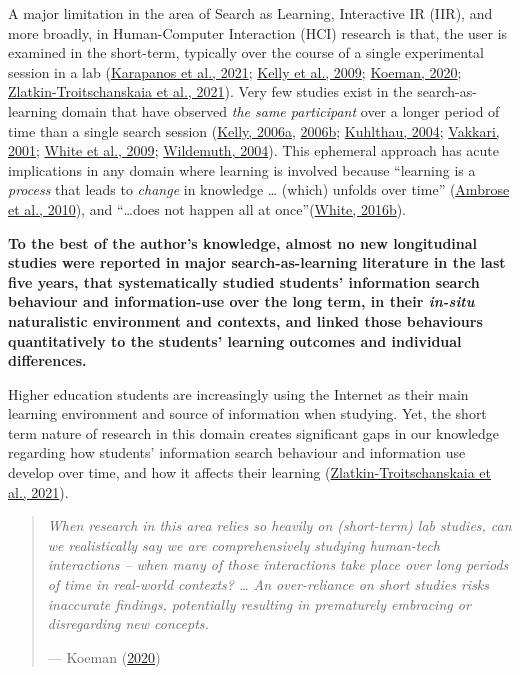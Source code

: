 \documentclass[letterpaper, nobind]{templates/ociamthesis}
\begin{document}
A major limitation in the area of Search as Learning, Interactive IR (IIR), and more broadly, in Human-Computer Interaction (HCI) research is
that, the user is examined in the short-term, typically over the course of a single experimental session in a lab
(\protect\hyperlink{ref-karapanos2021advances}{Karapanos et al., 2021}; \protect\hyperlink{ref-kelly2009evaluation}{Kelly et al., 2009}; \protect\hyperlink{ref-HCIUXres81_online}{Koeman, 2020}; \protect\hyperlink{ref-zlatkin2021students}{Zlatkin-Troitschanskaia et al., 2021}).
Very few studies exist in the search-as-learning domain that have observed \emph{the same participant} over a longer period of time than a single search session (\protect\hyperlink{ref-kelly2006measuring_a}{Kelly, 2006a}, \protect\hyperlink{ref-kelly2006measuring_b}{2006b}; \protect\hyperlink{ref-kuhlthau2004seeking}{Kuhlthau, 2004}; \protect\hyperlink{ref-vakkari2001changes}{Vakkari, 2001}; \protect\hyperlink{ref-white2009characterizing}{White et al., 2009}; \protect\hyperlink{ref-wildemuth2004effects}{Wildemuth, 2004}).
This ephemeral approach has acute implications in any domain where learning is involved because ``learning is a \emph{process} that leads to \emph{change} in knowledge \ldots{} (which) unfolds over time'' (\protect\hyperlink{ref-ambrose2010howa}{Ambrose et al., 2010}), and ``\ldots does not happen all at once''(\protect\hyperlink{ref-white_2016_iwss_learning}{White, 2016b}).

\textbf{To the best of the author's knowledge, almost no new longitudinal studies were reported in major search-as-learning literature in the last five years, that systematically studied students' information search behaviour and information-use over the long term, in their \emph{in-situ} naturalistic environment and contexts, and linked those behaviours quantitatively to the students' learning outcomes and individual differences.}

Higher education students are increasingly using the Internet as their main learning environment and source of information when studying. Yet, the short term nature of research in this domain creates significant gaps in our knowledge regarding how students' information search behaviour and information use develop over time, and how it affects their learning (\protect\hyperlink{ref-zlatkin2021students}{Zlatkin-Troitschanskaia et al., 2021}).

\begin{quote}
\emph{When research in this area relies so heavily on (short-term) lab studies, can we realistically say we are comprehensively studying human-tech interactions -- when many of those interactions take place over long periods of time in real-world contexts? \ldots{} An over-reliance on short studies risks inaccurate findings, potentially resulting in prematurely embracing or disregarding new concepts.}

\hfill --- Koeman (\protect\hyperlink{ref-HCIUXres81_online}{2020})
\end{quote}
\end{document}
